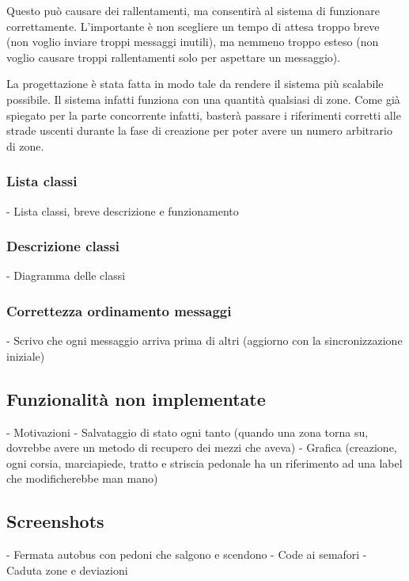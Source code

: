 \documentclass{article}
\begin{document}
Questo pu\`{o} causare dei rallentamenti, ma consentir\`{a} al sistema di funzionare correttamente. L\textquoteright{}importante \`{e} non scegliere un tempo di attesa troppo breve (non voglio inviare troppi messaggi inutili), ma nemmeno troppo esteso (non voglio causare troppi rallentamenti solo per aspettare un messaggio).
\par La progettazione \`{e} stata fatta in modo tale da rendere il sistema pi\`{u} scalabile possibile. Il sistema infatti funziona con una quantit\`{a} qualsiasi di zone. Come gi\`{a} spiegato per la parte concorrente infatti, baster\`{a} passare i riferimenti corretti alle strade uscenti durante la fase di creazione per poter avere un numero arbitrario di zone.

\subsubsection{Lista classi}
- Lista classi, breve descrizione e funzionamento
\subsubsection{Descrizione classi}
- Diagramma delle classi
\subsubsection{Correttezza ordinamento messaggi}
- Scrivo che ogni messaggio arriva prima di altri (aggiorno con la sincronizzazione iniziale)
\subsection{Funzionalit\`{a} non implementate}
- Motivazioni \newline
- Salvataggio di stato ogni tanto (quando una zona torna su, dovrebbe avere un metodo di recupero dei mezzi che aveva) \newline
- Grafica (creazione, ogni corsia, marciapiede, tratto e striscia pedonale ha un riferimento ad una label che modificherebbe man mano) \newline
\subsection{Screenshots}
- Fermata autobus con pedoni che salgono e scendono \newline
- Code ai semafori \newline
- Caduta zone e deviazioni

\newpage
\end{document}
